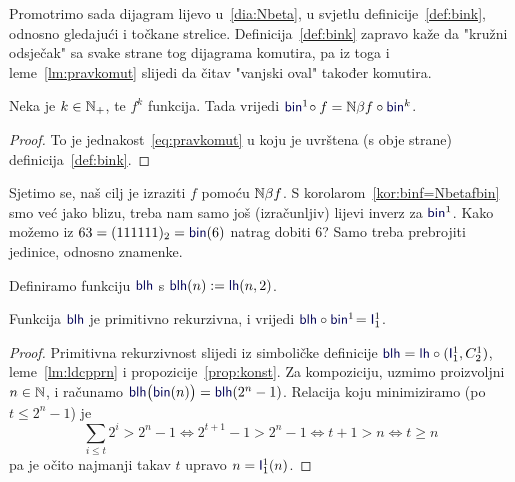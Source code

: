 Promotrimo sada dijagram lijevo u~\eqref{dia:Nbeta}, u svjetlu definicije~\ref{def:bink}, odnosno gledajući i točkane strelice. Definicija~\ref{def:bink} zapravo kaže da "kružni odsječak" sa svake strane tog dijagrama komutira, pa iz toga i leme~\ref{lm:pravkomut} slijedi da čitav "\!vanjski oval" također komutira.

\begin{korolar}\label{kor:binf=Nbetafbin}
Neka je $k\in{\mathbb N}_+$, te $f^k$ funkcija. Tada vrijedi
    $\f{bin}^1\!\circ f=\N\beta f\circ\f{bin}^k$.
\end{korolar}
\begin{proof}
To je jednakost~\eqref{eq:pravkomut} u koju je uvrštena (s obje strane) definicija~\ref{def:bink}.
\end{proof}


Sjetimo se, naš cilj je izraziti $f$ pomoću ${\mathbb N}\beta f$. S korolarom~\ref{kor:binf=Nbetafbin} smo već jako blizu, treba nam samo još (izračunljiv) lijevi inverz za $\f{bin}^1$. Kako možemo iz $63=(111111)_2=\f{bin}(6)$ natrag dobiti $6$? Samo treba prebrojiti jedinice, odnosno znamenke.

\begin{lema}\label{lm:blh}
Definiramo funkciju $\f{blh}$ s $\f{blh}(n):=\f{lh}(n,2)$. 

Funkcija $\f{blh}$ je primitivno rekurzivna, i vrijedi $\f{blh}\circ\f{bin}^1\!=\f I_1^1$.
\end{lema}
\begin{proof}
Primitivna rekurzivnost slijedi iz simboličke definicije $\f{blh}=\f{lh}\circ(\f I_1^1,C_2^1)$, leme~\ref{lm:ldcpprn} i propozicije~\ref{prop:konst}.
Za kompoziciju, uzmimo proizvoljni $n\in{\mathbb N}$, i računamo $\f{blh}\bigl(\f{bin}(n)\bigr)=\f{blh}(2^n-1)$. Relacija koju minimiziramo (po $t\le 2^n-1$) je
\begin{equation}
    \textstyle\sum_{i\le t}2^i>2^n-1
    \Longleftrightarrow
    2^{t+1}-1>2^n-1
    \Longleftrightarrow
    t+1>n
    \Longleftrightarrow
    t\ge n
\end{equation}
pa je očito najmanji takav $t$ upravo $n=\f I_1^1(n)$.\qedhere
\end{proof}


